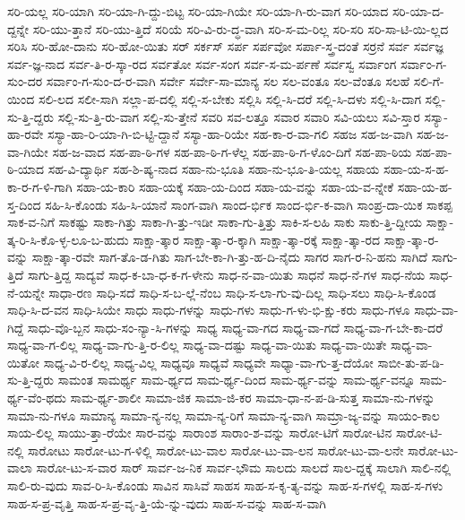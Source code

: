 {ಸರಿ-ಯಲ್ಲ
ಸರಿ-ಯಾಗಿ
ಸರಿ-ಯಾ-ಗಿ-ದ್ದು-ಬಿಟ್ಟ
ಸರಿ-ಯಾ-ಗಿಯೇ
ಸರಿ-ಯಾ-ಗಿ-ರು-ವಾಗ
ಸರಿ-ಯಾದ
ಸರಿ-ಯಾ-ದ-ದ್ದನ್ನೇ
ಸರಿ-ಯು-ತ್ತಾನೆ
ಸರಿ-ಯು-ತ್ತಿದೆ
ಸರಿಯೆ
ಸರಿ-ವಿ-ರು-ದ್ಧ-ವಾಗಿ
ಸರಿ-ಸ-ಮ-ರಿಲ್ಲ
ಸರಿ-ಸರಿ
ಸರಿ-ಸಾ-ಟಿ-ಯಿ-ಲ್ಲದ
ಸರಿಸಿ
ಸರಿ-ಹೋ-ದಾನು
ಸರಿ-ಹೋ-ಯಿತು
ಸರ್
ಸರ್ಕಸ್
ಸರ್ಪ
ಸರ್ಪವೋ
ಸರ್ಪಾ-ಸ್ತ್ರ-ದಂತೆ
ಸರ್ರನೆ
ಸರ್ವ
ಸರ್ವಜ್ಞ
ಸರ್ವ-ಜ್ಞ-ನಾದ
ಸರ್ವ-ತಿ-ರ-ಸ್ಕಾ-ರದ
ಸರ್ವತೋ
ಸರ್ವ-ಸಂಗ
ಸರ್ವ-ಸ-ಮ-ರ್ಪಣೆ
ಸರ್ವಸ್ವ
ಸರ್ವಾಂಗ
ಸರ್ವಾಂ-ಗ-ಸುಂ-ದರ
ಸರ್ವಾಂ-ಗ-ಸುಂ-ದ-ರ-ವಾಗಿ
ಸರ್ವೇ
ಸರ್ವೇ-ಸಾ-ಮಾನ್ಯ
ಸಲ
ಸಲ-ವಂತೂ
ಸಲ-ವೆಂತೂ
ಸಲಹೆ
ಸಲಿ-ಗೆ-ಯಿಂದ
ಸಲಿ-ಲದ
ಸಲೀ-ಸಾಗಿ
ಸಲ್ಲಾ-ಪ-ದಲ್ಲಿ
ಸಲ್ಲಿ-ಸ-ಬೇಕು
ಸಲ್ಲಿಸಿ
ಸಲ್ಲಿ-ಸಿ-ದರೆ
ಸಲ್ಲಿ-ಸಿ-ದಳು
ಸಲ್ಲಿ-ಸಿ-ದಾಗ
ಸಲ್ಲಿ-ಸು-ತ್ತಿ-ದ್ದರು
ಸಲ್ಲಿ-ಸು-ತ್ತಿ-ರು-ವಾಗ
ಸಲ್ಲಿ-ಸು-ತ್ತೇನೆ
ಸವರಿ
ಸವ-ಲತ್ತೂ
ಸವಾರ
ಸವಾರಿ
ಸವಿ-ಯಲು
ಸವಿ-ಸ್ತಾರ
ಸಸ್ಯಾ-ಹಾ-ರವೇ
ಸಸ್ಯಾ-ಹಾ-ರಿ-ಯಾ-ಗಿ-ಬಿ-ಟ್ಟಿ-ದ್ದಾನೆ
ಸಸ್ಯಾ-ಹಾ-ರಿಯೇ
ಸಹ-ಕಾ-ರ-ವಾ-ಗಲಿ
ಸಹಜ
ಸಹ-ಜ-ವಾಗಿ
ಸಹ-ಜ-ವಾ-ಗಿಯೇ
ಸಹ-ಜ-ವಾದ
ಸಹ-ಪಾ-ಠಿ-ಗಳ
ಸಹ-ಪಾ-ಠಿ-ಗ-ಳೆಲ್ಲ
ಸಹ-ಪಾ-ಠಿ-ಗ-ಳೊಂ-ದಿಗೆ
ಸಹ-ಪಾ-ಠಿಯ
ಸಹ-ಪಾ-ಠಿ-ಯಾದ
ಸಹ-ವಿ-ದ್ಯಾರ್ಥಿ
ಸಹ-ಶಿ-ಷ್ಯ-ನಾದ
ಸಹಾ-ನು-ಭೂತಿ
ಸಹಾ-ನು-ಭೂ-ತಿ-ಯಲ್ಲ
ಸಹಾಯ
ಸಹಾ-ಯ-ಸ-ಹ-ಕಾ-ರ-ಗ-ಳಿ-ಗಾಗಿ
ಸಹಾ-ಯ-ಕಾರಿ
ಸಹಾ-ಯಕ್ಕೆ
ಸಹಾ-ಯ-ದಿಂದ
ಸಹಾ-ಯ-ವನ್ನು
ಸಹಾ-ಯ-ವ-ನ್ನೇಕೆ
ಸಹಾ-ಯ-ಹ-ಸ್ತ-ದಿಂದ
ಸಹಿ-ಸಿ-ಕೊಂಡು
ಸಹಿ-ಸಿ-ಯಾನೆ
ಸಾಂಗ-ವಾಗಿ
ಸಾಂದ-ರ್ಭಿಕ
ಸಾಂದ-ರ್ಭಿ-ಕ-ವಾಗಿ
ಸಾಂಪ್ರ-ದಾ-ಯಿಕ
ಸಾಕಪ್ಪ
ಸಾಕ-ವ-ನಿಗೆ
ಸಾಕಷ್ಟು
ಸಾಕಾ-ಗಿತ್ತು
ಸಾಕಾ-ಗಿ-ತ್ತು-ಇಡೀ
ಸಾಕಾ-ಗು-ತ್ತಿತ್ತು
ಸಾಕಿ-ಸ-ಲಹಿ
ಸಾಕು
ಸಾಕು-ತ್ತಿ-ದ್ದೀಯ
ಸಾಕ್ಷಾ-ತ್ಕ-ರಿ-ಸಿ-ಕೊ-ಳ್ಳ-ಲೂ-ಬ-ಹುದು
ಸಾಕ್ಷಾ-ತ್ಕಾರ
ಸಾಕ್ಷಾ-ತ್ಕಾ-ರ-ಕ್ಕಾಗಿ
ಸಾಕ್ಷಾ-ತ್ಕಾ-ರಕ್ಕೆ
ಸಾಕ್ಷಾ-ತ್ಕಾ-ರದ
ಸಾಕ್ಷಾ-ತ್ಕಾ-ರ-ವನ್ನು
ಸಾಕ್ಷಾ-ತ್ಕಾ-ರವೇ
ಸಾಗ-ತೊ-ಡ-ಗಿತು
ಸಾಗ-ಬೇ-ಕಾ-ಗಿ-ತ್ತು-ಹ-ದಿ-ನೈದು
ಸಾಗರ
ಸಾಗ-ರ-ನಿ-ಹನು
ಸಾಗಿದೆ
ಸಾಗು-ತ್ತಿದೆ
ಸಾಗು-ತ್ತಿದ್ದ
ಸಾದ್ಯವೆ
ಸಾಧ-ಕ-ಬಾ-ಧ-ಕ-ಗ-ಳೇನು
ಸಾಧ-ನ-ವಾ-ಯಿತು
ಸಾಧನೆ
ಸಾಧ-ನೆ-ಗಳ
ಸಾಧ-ನೆಯ
ಸಾಧ-ನೆ-ಯನ್ನೇ
ಸಾಧಾ-ರಣ
ಸಾಧಿ-ಸದೆ
ಸಾಧಿ-ಸ-ಬ-ಲ್ಲೆ-ನೆಂಬ
ಸಾಧಿ-ಸ-ಲಾ-ಗು-ವು-ದಿಲ್ಲ
ಸಾಧಿ-ಸಲು
ಸಾಧಿ-ಸಿ-ಕೊಂಡ
ಸಾಧಿ-ಸಿ-ದ-ವನ
ಸಾಧಿ-ಸಿಯೇ
ಸಾಧು
ಸಾಧು-ಗಳನ್ನು
ಸಾಧು-ಗಳು
ಸಾಧು-ಗ-ಳು-ಭಿ-ಕ್ಷು-ಕರು
ಸಾಧು-ಗಳೂ
ಸಾಧು-ವಾ-ಗಿದ್ದೆ
ಸಾಧು-ವೊ-ಬ್ಬನ
ಸಾಧು-ಸಂ-ನ್ಯಾ-ಸಿ-ಗಳನ್ನು
ಸಾಧ್ಯ
ಸಾಧ್ಯ-ವಾ-ಗದ
ಸಾಧ್ಯ-ವಾ-ಗದೆ
ಸಾಧ್ಯ-ವಾ-ಗ-ಬೇ-ಕಾ-ದರೆ
ಸಾಧ್ಯ-ವಾ-ಗ-ಲಿಲ್ಲ
ಸಾಧ್ಯ-ವಾ-ಗು-ತ್ತಿ-ರ-ಲಿಲ್ಲ
ಸಾಧ್ಯ-ವಾ-ದಷ್ಟು
ಸಾಧ್ಯ-ವಾ-ಯಿತು
ಸಾಧ್ಯ-ವಾ-ಯಿತೇ
ಸಾಧ್ಯ-ವಾ-ಯಿತೋ
ಸಾಧ್ಯ-ವಿ-ರ-ಲಿಲ್ಲ
ಸಾಧ್ಯ-ವಿಲ್ಲ
ಸಾಧ್ಯವೂ
ಸಾಧ್ಯವೆ
ಸಾಧ್ಯವೇ
ಸಾಧ್ಯಾ-ವಾ-ಗು-ತ್ತ-ದೆಯೋ
ಸಾಬೀ-ತು-ಪ-ಡಿ-ಸು-ತ್ತಿ-ದ್ದರು
ಸಾಮಂತ
ಸಾಮರ್ಥ್ಯ
ಸಾಮ-ರ್ಥ್ಯದ
ಸಾಮ-ರ್ಥ್ಯ-ದಿಂದ
ಸಾಮ-ರ್ಥ್ಯ-ವನ್ನು
ಸಾಮ-ರ್ಥ್ಯ-ವನ್ನೂ
ಸಾಮ-ರ್ಥ್ಯ-ವೆಂ-ಥದು
ಸಾಮ-ರ್ಥ್ಯ-ಶಾಲೀ
ಸಾಮಾ-ಜಿಕ
ಸಾಮಾ-ಜಿ-ಕರ
ಸಾಮಾ-ಧಾ-ನ-ಪ-ಡಿ-ಸುತ್ತ
ಸಾಮಾ-ನು-ಗಳನ್ನು
ಸಾಮಾ-ನು-ಗಳೂ
ಸಾಮಾನ್ಯ
ಸಾಮಾ-ನ್ಯ-ನಲ್ಲ
ಸಾಮಾ-ನ್ಯ-ರಿಗೆ
ಸಾಮಾ-ನ್ಯ-ವಾಗಿ
ಸಾಮ್ರಾ-ಜ್ಯ-ವನ್ನು
ಸಾಯಂ-ಕಾಲ
ಸಾಯ-ಲಿಲ್ಲ
ಸಾಯು-ತ್ತಾ-ರೆಯೇ
ಸಾರ-ವನ್ನು
ಸಾರಾಂಶ
ಸಾರಾಂ-ಶ-ವನ್ನು
ಸಾರೋ-ಟಿಗೆ
ಸಾರೋ-ಟಿನ
ಸಾರೋ-ಟಿ-ನಲ್ಲಿ
ಸಾರೋಟು
ಸಾರೋ-ಟು-ಗ-ಳಿಲ್ಲಿ
ಸಾರೋ-ಟು-ವಾಲ
ಸಾರೋ-ಟು-ವಾ-ಲನ
ಸಾರೋ-ಟು-ವಾ-ಲನೇ
ಸಾರೋ-ಟು-ವಾಲಾ
ಸಾರೋ-ಟು-ಸ-ವಾರ
ಸಾರ್
ಸಾರ್ವ-ಜ-ನಿಕ
ಸಾರ್ವ-ಭೌಮ
ಸಾಲದು
ಸಾಲದೆ
ಸಾಲ-ದ್ದಕ್ಕೆ
ಸಾಲಾಗಿ
ಸಾಲಿ-ನಲ್ಲಿ
ಸಾಲಿ-ರು-ವುದು
ಸಾವ-ರಿ-ಸಿ-ಕೊಂಡು
ಸಾವಿನ
ಸಾಸಿವೆ
ಸಾಹಸ
ಸಾಹ-ಸ-ಕೃ-ತ್ಯ-ವನ್ನು
ಸಾಹ-ಸ-ಗಳಲ್ಲಿ
ಸಾಹ-ಸ-ಗಳು
ಸಾಹ-ಸ-ಪ್ರ-ವೃತ್ತಿ
ಸಾಹ-ಸ-ಪ್ರ-ವೃ-ತ್ತಿ-ಯೆ-ನ್ನು-ವುದು
ಸಾಹ-ಸ-ವನ್ನು
ಸಾಹ-ಸ-ವಾಗಿ
}
